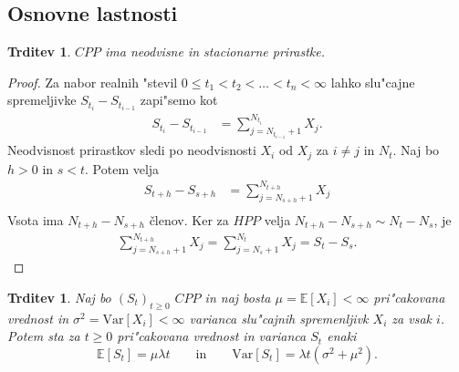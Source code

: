 \documentclass[12pt, a4paper, reqno]{amsart}
\theoremstyle{definition}
\theoremstyle{plain}
\newtheorem{trditev}[definicija]{Trditev}
\newcommand{\E}{\mathbb{E}}
\newcommand{\1}{\mathds{1}}
\newcommand{\Var}[1]{\text{Var}\left[#1\right]}
\begin{document}
    \subsection{Osnovne lastnosti}

        \begin{trditev}
            $CPP$ ima neodvisne in stacionarne prirastke.
            \label{trd:neodvPrirCPP}
        \end{trditev}

        \begin{proof}
            Za nabor realnih "stevil $0 \leq t_1 < t_2 < \ldots < t_n < \infty$ lahko slu"cajne
            spremeljivke $S_{t_i} - S_{t_{i-1}}$ zapi"semo kot
            \begin{align*}
                S_{t_i} - S_{t_{i-1}} &= \sum_{j=N_{t_{i-1}}+1}^{N_{t_i}} X_j. 
            \end{align*}
            Neodvisnost prirastkov sledi po neodvisnosti $X_i$ od $X_j$ za $i\neq j$ in $N_t$. 
            Naj bo $h > 0$ in $s < t$. Potem velja
            \begin{align*}
                S_{t+h} - S_{s+h} &= \sum_{j=N_{s+h}+1}^{N_{t+h}} X_j \\
            \end{align*}
            Vsota ima $N_{t+h} - N_{s+h}$ členov. Ker za $HPP$ velja 
            $N_{t+h} - N_{s+h} \sim N_t - N_s$, je 
            \begin{align*}
                \sum_{j=N_{s+h}+1}^{N_{t+h}} X_j = \sum_{j=N_{s}+1}^{N_{t}} X_j = S_t - S_s.
            \end{align*}
        \end{proof}

        \begin{trditev}
            Naj bo $(S_t)_{t\geq 0}$ $CPP$ in naj bosta $\mu = \E\left[X_i\right] < \infty$ 
            pri"cakovana vrednost in $\sigma^2= \Var{X_i} <\infty$ varianca
            slu"cajnih spremenljivk $X_i$ za vsak $i$. Potem sta za $t\geq0$ pri"cakovana vrednost in 
            varianca $S_t$ enaki 
            \begin{equation*}
                \E\left[S_t\right] = \mu\lambda t \qquad \text{in} \qquad \Var{S_t} = \lambda t\left(\sigma^2 + \mu^2\right).
            \end{equation*}
            \label{trd:PricVarCPP}
        \end{trditev}
\end{document}

